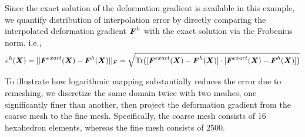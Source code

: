 \documentclass[12pt]{article}
\begin{document}
Since the exact solution of the deformation gradient is available in this example, 
we quantify distribution of interpolation error by directly comparing the interpolated 
deformation gradient ${\boldsymbol{F}}^{h}$ with the exact solution via the Frobenius norm, i.e., 
\begin{equation}
 e^{h}({\boldsymbol{X}}) = || {\boldsymbol{F}}^{exact} ({\boldsymbol{X}})- {\boldsymbol{F}}^{h}({\boldsymbol{X}}) ||_{F} 
 = \sqrt{\text{Tr}\big( [{\boldsymbol{F}}^{exact} ({\boldsymbol{X}})- {\boldsymbol{F}}^{h}({\boldsymbol{X}})] 
     \cdot [{\boldsymbol{F}}^{exact} ({\boldsymbol{X}})- {\boldsymbol{F}}^{h}({\boldsymbol{X}})] \big) }
 \label{eq:FrobeniusNormDistribution}
\end{equation} 

To illustrate how logarithmic mapping substantially reduces the error due to 
remeshing, we discretize the same domain twice with two meshes, one significantly finer
than another, then project the deformation gradient from the coarse mesh to the fine mesh.  
Specifically, the coarse mesh consists of 16 hexahedron elements, whereas the fine mesh consists of 2500. 
 
\end{document}
